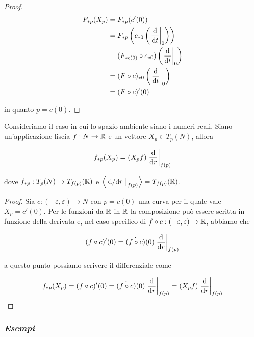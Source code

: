 \begin{proof}
	\begin{align}
		\begin{split}
			F_{*p}(X_{p}) &= F_{*p}(c'(0)) \\
			&= F_{*p} \left( c_{*0} \left( \eval{ \dv{t} }_{0} \right) \right) \\
			&= (F_{*c(0)} \circ c_{*0}) \left( \eval{ \dv{t} }_{0} \right) \\
			&= (F \circ c)_{*0} \left( \eval{ \dv{t} }_{0} \right) \\
			&= (F \circ c)' (0)
		\end{split}
	\end{align}

	in quanto $ p = c(0) $.
\end{proof}

\begin{corollary}
	Consideriamo il caso in cui lo spazio ambiente siano i numeri reali. Siano un'applicazione liscia $ f : N \to \mathbb{R} $ e un vettore $ X_{p} \in T_{p}(N) $, allora
	
	\begin{equation}
		f_{*p}(X_{p}) = (X_{p} f) \eval{ \dv{r} }_{f(p)}
	\end{equation}

	dove $ f_{*p} : T_{p}(N) \to T_{f(p)}(\mathbb{R}) $ e $ \ev{ \eval{ \dv*{r} }_{f(p)} } = T_{f(p)}(\R) $.
\end{corollary}

\begin{proof}
	Sia $ c : (-\varepsilon,\varepsilon) \to N $ con $ p = c(0) $ una curva per il quale vale $ X_{p} = c'(0) $. Per le funzioni da $ \mathbb{R} $ in $ \mathbb{R} $ la composizione può essere scritta in funzione della derivata e, nel caso specifico di $ f \circ c : (-\varepsilon,\varepsilon) \to \mathbb{R} $, abbiamo che
	
	\begin{equation}
		(f \circ c)'(0) = \dot{(f \circ c)}(0) \eval{ \dv{r} }_{f(p)}
	\end{equation}

	a questo punto possiamo scrivere il differenziale come
	
	\begin{equation}
		f_{*p}(X_{p}) = (f \circ c)' (0) %
		= \dot{(f \circ c)}(0) \eval{ \dv{r} }_{f(p)} %
		= (X_{p} f) \eval{ \dv{r} }_{f(p)}
	\end{equation}
\end{proof}

\subsubsection{\textit{Esempi}}


